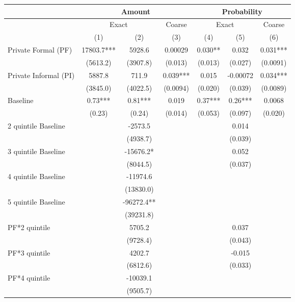 \begin{tabular}{lcccccc}
\toprule
      & \multicolumn{3}{c}{Amount} & \multicolumn{3}{c}{Probability} \\
\midrule
\midrule
      & \multicolumn{2}{c}{Exact} & Coarse  & \multicolumn{2}{c}{Exact} & Coarse  \\
\midrule
      & (1)   & (2)   & (3)   & (4)   & (5)   & (6) \\
\midrule
\midrule
Private Formal (PF) & 17803.7*** & 5928.6 & 0.00029 & 0.030** & 0.032 & 0.031*** \\
      & (5613.2) & (3907.8) & (0.013) & (0.013) & (0.027) & (0.0091) \\
Private Informal (PI) & 5887.8 & 711.9 & 0.039*** & 0.015 & -0.00072 & 0.034*** \\
      & (3845.0) & (4022.5) & (0.0094) & (0.020) & (0.039) & (0.0089) \\
Baseline & 0.73*** & 0.81*** & 0.019 & 0.37*** & 0.26*** & 0.0068 \\
      & (0.23) & (0.24) & (0.014) & (0.053) & (0.097) & (0.020) \\
2 quintile Baseline &       & -2573.5 &       &       & 0.014 &  \\
      &       & (4938.7) &       &       & (0.039) &  \\
3 quintile Baseline &       & -15676.2* &       &       & 0.052 &  \\
      &       & (8044.5) &       &       & (0.037) &  \\
4 quintile Baseline &       & -11974.6 &       &       &       &  \\
      &       & (13830.0) &       &       &       &  \\
5 quintile Baseline &       & -96272.4** &       &       &       &  \\
      &       & (39231.8) &       &       &       &  \\
PF*2 quintile &       & 5705.2 &       &       & 0.037 &  \\
      &       & (9728.4) &       &       & (0.043) &  \\
PF*3 quintile &       & 4202.7 &       &       & -0.015 &  \\
      &       & (6812.6) &       &       & (0.033) &  \\
PF*4 quintile &       & -10039.1 &       &       &       &  \\
      &       & (9505.7) &       &       &       &  \\

\end{tabular}
